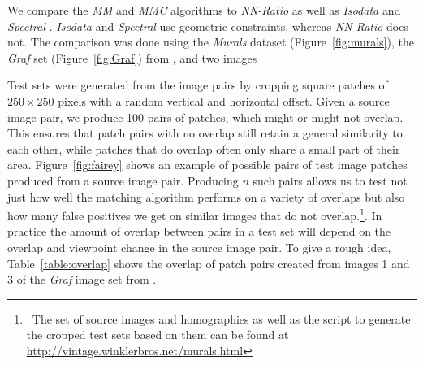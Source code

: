\documentclass[conference]{IEEEtran}
\begin{document}


%
%
We compare the \emph{MM} and \emph{MMC} algorithms to \emph{NN-Ratio} 
\cite{lowe2004sift} as well as \emph{Isodata} \cite{das2008event} and 
\emph{Spectral} \cite{leordeanu2005spectral}.  \emph{Isodata} and 
\emph{Spectral} use geometric constraints, whereas \emph{NN-Ratio} does 
not.
The comparison was done using the \emph{Murals} dataset 
(Figure~\ref{fig:murals}), the \emph{Graf} set (Figure~\ref{fig:Graf}) 
from \cite{mikolajczyk2005performance}, and two images 

Test sets were generated from the image pairs by cropping square patches of
$250\!\times\!250$ pixels with a random vertical and horizontal offset.  
Given a source image pair, we produce 100 pairs of patches, which might or might not overlap.  
This ensures that patch pairs with no overlap still retain a general similarity to each 
other, while patches that do overlap often only share a small 
part of their area. Figure~\ref{fig:fairey} shows an example of 
possible pairs of test image patches produced from a source image pair.  
Producing $n$ such pairs allows us to test not just how well the 
matching algorithm performs on a variety of overlaps but also how many 
false positives we get on similar images that do not 
overlap.\footnote{~The set of source images and homographies as well as 
the script to generate the cropped test sets based on them can be found 
at 
\href{http://vintage.winklerbros.net/murals.html}{http://vintage.winklerbros.net/murals.html}}.  
In practice the amount of overlap between pairs in a test set will 
depend on the overlap and viewpoint change in the source image pair.  To 
give a rough idea, Table~\ref{table:overlap} shows the overlap of patch 
pairs created from images 1 and 3 of the \emph{Graf} image set from 
\cite{mikolajczyk2005performance}.
\end{document}
